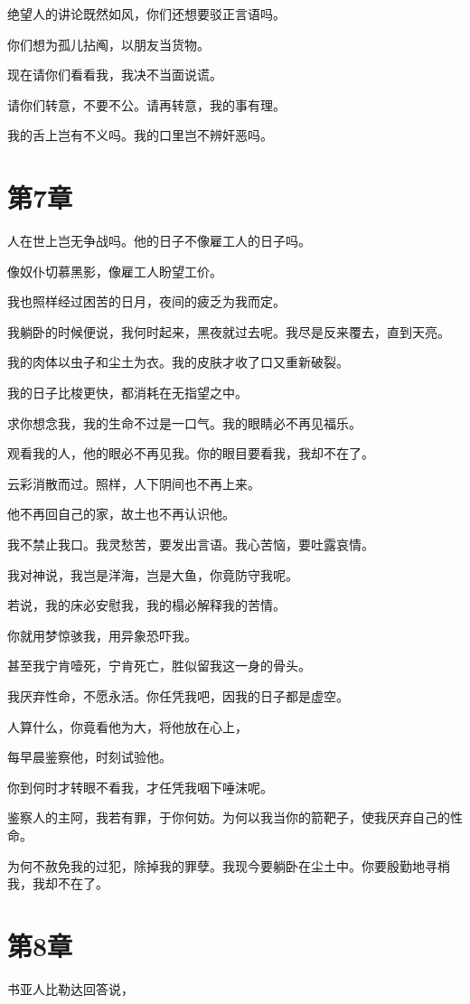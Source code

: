\documentclass[12pt,oneside]{book}
\begin{document}
绝望人的讲论既然如风，你们还想要驳正言语吗。

你们想为孤儿拈阄，以朋友当货物。

现在请你们看看我，我决不当面说谎。

请你们转意，不要不公。请再转意，我的事有理。

我的舌上岂有不义吗。我的口里岂不辨奸恶吗。



\chapter{第7章}
人在世上岂无争战吗。他的日子不像雇工人的日子吗。

像奴仆切慕黑影，像雇工人盼望工价。

我也照样经过困苦的日月，夜间的疲乏为我而定。

我躺卧的时候便说，我何时起来，黑夜就过去呢。我尽是反来覆去，直到天亮。

我的肉体以虫子和尘土为衣。我的皮肤才收了口又重新破裂。

我的日子比梭更快，都消耗在无指望之中。

求你想念我，我的生命不过是一口气。我的眼睛必不再见福乐。

观看我的人，他的眼必不再见我。你的眼目要看我，我却不在了。

云彩消散而过。照样，人下阴间也不再上来。

他不再回自己的家，故土也不再认识他。

我不禁止我口。我灵愁苦，要发出言语。我心苦恼，要吐露哀情。

我对神说，我岂是洋海，岂是大鱼，你竟防守我呢。

若说，我的床必安慰我，我的榻必解释我的苦情。

你就用梦惊骇我，用异象恐吓我。

甚至我宁肯噎死，宁肯死亡，胜似留我这一身的骨头。

我厌弃性命，不愿永活。你任凭我吧，因我的日子都是虚空。

人算什么，你竟看他为大，将他放在心上，

每早晨鉴察他，时刻试验他。

你到何时才转眼不看我，才任凭我咽下唾沫呢。

鉴察人的主阿，我若有罪，于你何妨。为何以我当你的箭靶子，使我厌弃自己的性命。

为何不赦免我的过犯，除掉我的罪孽。我现今要躺卧在尘土中。你要殷勤地寻梢我，我却不在了。


\chapter{第8章}
书亚人比勒达回答说，
\end{document}
